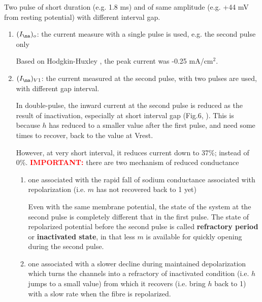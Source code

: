 Two pulse of short duration (e.g. 1.8 ms) and of same amplitude (e.g. +44 mV
from resting potential) with different interval gap.
\begin{enumerate}
  \item $(I_\na)_o$: the current measure with a single pulse is used, e.g. the
  second pulse only

Based on Hodgkin-Huxley \citep{hodgkin1952dem}, the peak current was -0.25
mA/cm$^2$.

  \item $(I_\na)_{V1}$: the current measured at the second pulse, with two
  pulses are used, with different gap interval.

In double-pulse, the inward current at the second pulse is reduced as the result
of inactivation, especially at short interval gap (Fig.6,
\citep{hodgkin1952dem}).
This is because $h$ has reduced to a smaller value after the first pulse, and
need some times to recover, back to the value at Vrest.

However, at very short interval, it reduces current down to 37\%; instead of
0\%.
\textcolor{red}{\bf IMPORTANT:}
there are two mechanism of reduced conductance
\begin{enumerate}

  \item one associated with the rapid fall of sodium conductance associated with
  repolarization (i.e. $m$ has not recovered back to 1 yet)

Even with the same membrane potential, the state of the system at the second
pulse is completely different that in the first pulse. The state of repolarized
potential before the second pulse is called {\bf refractory period} or {\bf
inactivated state}, in that less $m$ is available for quickly opening during the
second pulse.

  \item one associated with a slower decline during maintained depolarization
  which turns the channels into a refractory of inactivated condition (i.e. $h$
  jumps to a small value) from which it recovers (i.e. bring $h$ back to 1) with
  a slow rate when the fibre is repolarized.


\end{enumerate}



\end{enumerate}

